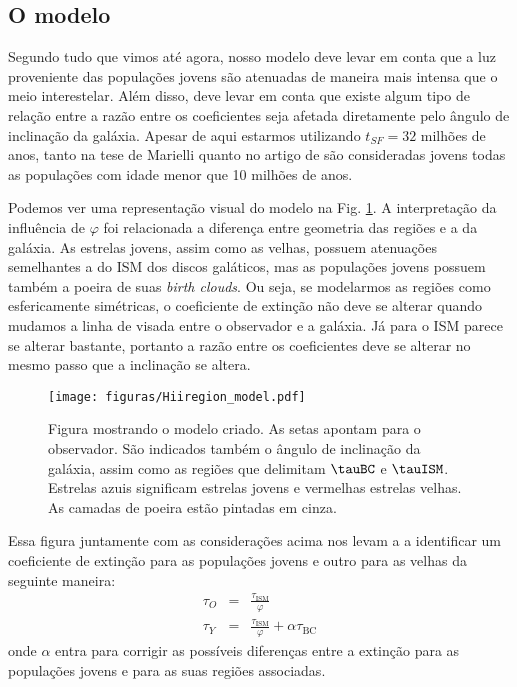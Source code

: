 \subsection{O modelo}
\label{sec:difextin:modeleinterp:model}

Segundo tudo que vimos até agora, nosso modelo deve levar em conta que a luz proveniente das
populações jovens são atenuadas de maneira mais intensa que o meio interestelar. Além disso, deve
levar em conta que existe algum tipo de relação entre a razão entre os coeficientes seja afetada
diretamente pelo ângulo de inclinação da galáxia. Apesar de aqui estarmos utilizando $t_{SF} = 32$
milhões de anos, tanto na tese de Marielli quanto no artigo de \citet{Charlot.Fall.2000a} são
consideradas jovens todas as populações com idade menor que 10 milhões de anos.

Podemos ver uma representação visual do modelo na Fig. \ref{fig:model}. A interpretação da
influência de $\varphi$ foi relacionada a diferença entre geometria das regiões \Hii e a da galáxia.
As estrelas jovens, assim como as velhas, possuem atenuações semelhantes a do ISM dos discos
galáticos, mas as populações jovens possuem também a poeira de suas {\em birth clouds}. Ou seja, se
modelarmos as regiões \Hii como esfericamente simétricas, o coeficiente de extinção não deve se
alterar quando mudamos a linha de visada entre o observador e a galáxia. Já para o ISM parece se
alterar bastante, portanto a razão entre os coeficientes deve se alterar no mesmo passo que a
inclinação se altera.

\begin{figure}
	\texttt{[image: figuras/Hiiregion\_model.pdf]}
	\caption[Modelo para extinção diferencial]
	{Figura mostrando o modelo criado. As setas apontam para o observador. São indicados também o
ângulo de inclinação da galáxia, assim como as regiões que delimitam $\tauBC$ e $\tauISM$. Estrelas
azuis significam estrelas jovens e vermelhas estrelas velhas. As camadas de poeira estão pintadas
em cinza.}
	\label{fig:model}
\end{figure}

Essa figura juntamente com as considerações acima nos levam a a identificar um coeficiente de
extinção para as populações jovens e outro para as velhas da seguinte maneira:
\begin{eqnarray}
	\tau_O &=& \frac{\tau_{\mathrm{ISM}}}{\varphi} \\
	\label{eq:tauO}
	\tau_Y &=& \frac{\tau_{\mathrm{ISM}}}{\varphi} + \alpha\tau_{\mathrm{BC}}
	\label{eq:tauY} 
\end{eqnarray}
\noindent onde $\alpha$ entra para corrigir as possíveis diferenças entre a extinção para as
populações jovens e para as suas regiões \Hii associadas.

